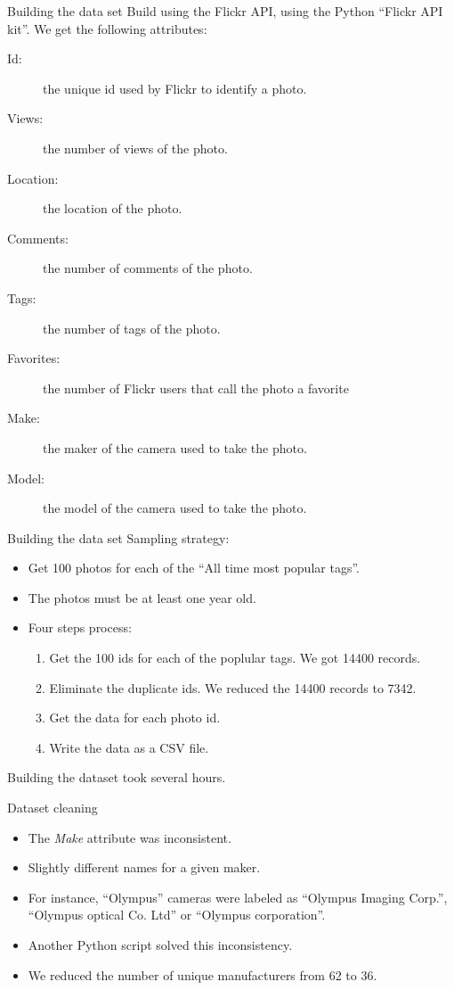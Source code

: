 \documentclass[ignorenonframetext]{beamer}
\begin{document}
\begin{frame}{Building the data set}
Build using the Flickr API, using the Python ``Flickr API kit''. We get the following attributes:

\begin{description}
\item[Id:] the unique id used by Flickr to identify a photo.
\item[Views:] the number of views of the photo.
\item[Location:] the location of the photo.
\item[Comments:] the number of comments of the photo.
\item[Tags:] the number of tags of the photo.
\item[Favorites:] the number of Flickr users that call the photo a favorite
\item[Make:] the maker of the camera used to take the photo.
\item[Model:] the model of the camera used to take the photo.
\end{description}
\end{frame}

\begin{frame}{Building the data set}
Sampling strategy: 
\begin{itemize}
\item Get 100 photos for each of the ``All time most popular tags''.
\item The photos must be at least one year old.
\item Four steps process:
\begin{enumerate}
\item Get the 100 ids for each of the poplular tags. We got 14400 records.
\item Eliminate the duplicate ids. We reduced the 14400 records to 7342.
\item Get the data for each photo id.
\item Write the data as a CSV file.
\end{enumerate}
\end{itemize}

Building the dataset took several hours.
\end{frame}

\begin{frame}{Dataset cleaning}
\begin{itemize}
\item The \emph{Make} attribute was inconsistent.
\item Slightly different names for a given maker. 
\item For instance, ``Olympus'' cameras were labeled as ``Olympus Imaging Corp.'', ``Olympus optical Co. Ltd'' or ``Olympus corporation''. 
\item Another Python script  solved this inconsistency.
\item We reduced the number of unique manufacturers from 62 to 36.
\end{itemize}
\end{frame}
\end{document}
